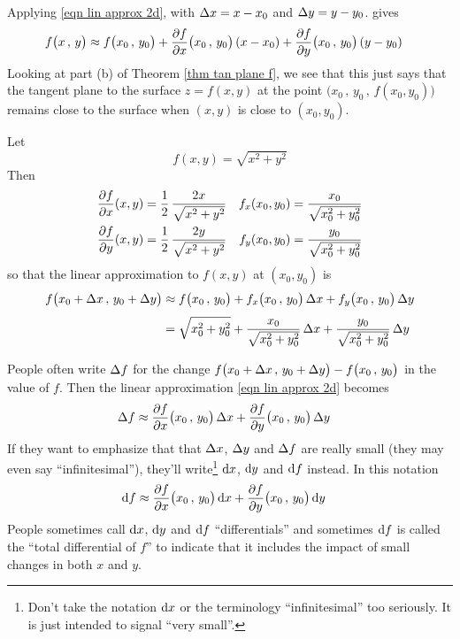 \begin{remark}\label{rmk lin approx tan plane}
Applying \eqref{eqn lin approx 2d}, with $\Delta x=x-x_0$ and $\Delta y = y-y_0$.
gives
\begin{align*}
f\big(x\,,\,y\big)
&\approx f\big(x_0\,,\,y_0\big) 
       + \pdiff{f}{x}\big(x_0\,,\,y_0\big)\,(x-x_0)
       + \pdiff{f}{y}\big(x_0\,,\,y_0\big)\,(y-y_0)
\end{align*}
Looking at part (b) of Theorem \ref{thm tan plane f},
we see that this just says that the tangent plane to the surface 
$z=f(x,y)$ at the point $\big(x_0\,,\,y_0\,,\,f(x_0,y_0)\big)$
remains close to the surface when $(x,y)$ is close to $(x_0,y_0)$.
\end{remark}


\begin{eg}\label{eg approx AA}
Let 
\begin{equation*}
f(x,y) = \sqrt{x^2+y^2}
\end{equation*}
Then
\begin{align*}
\pdiff{f}{x}(x,y)&=\frac{1}{2}\,\frac{2x}{\sqrt{x^2+y^2}} &
    f_x(x_0,y_0)&=\frac{x_0}{\sqrt{x_0^2+y_0^2}} \\
\pdiff{f}{y}(x,y)&=\frac{1}{2}\,\frac{2y}{\sqrt{x^2+y^2}} &
    f_y(x_0,y_0)&=\frac{y_0}{\sqrt{x_0^2+y_0^2}} 
\end{align*}
so that the linear approximation to $f(x,y)$ at $(x_0,y_0)$ is
\begin{align*}
f\big(x_0+\Delta x\,,\,y_0+\Delta y\big)
&\approx f\big(x_0\,,\,y_0\big) 
       + f_x\big(x_0\,,\,y_0\big)\,\Delta x
       + f_y\big(x_0\,,\,y_0\big)\,\Delta y \\[0.05in]
&=\sqrt{x_0^2+y_0^2} 
       + \frac{x_0}{\sqrt{x_0^2+y_0^2}}\,\Delta x
       + \frac{y_0}{\sqrt{x_0^2+y_0^2}}\,\Delta y 
\end{align*}

\end{eg}

\begin{notn}\label{notn approx}
People often write $\Delta f$ for the change 
$f\big(x_0+\Delta x\,,\,y_0+\Delta y\big)
  - f\big(x_0\,,\,y_0\big)$ in the value of $f$. 
Then the linear approximation \eqref{eqn lin approx 2d} becomes
\begin{align*}
\De f
&\approx  \pdiff{f}{x}\big(x_0\,,\,y_0\big)\,\De x
       + \pdiff{f}{y}\big(x_0\,,\,y_0\big)\,\De y
\end{align*}
If they want to emphasize that that $\Delta x$, $\Delta y$ and $\Delta f$
are really small (they may even say ``infinitesimal''), they'll
write\footnote{Don't take the notation $\mathrm{d}x$ or the terminology
``infinitesimal'' too seriously. It is just intended to signal ``very small''.} $\mathrm{d}x$, $\mathrm{d}y$ and $\mathrm{d}f$ instead. In this notation
\begin{align*}
\dee{f}
&\approx  \pdiff{f}{x}\big(x_0\,,\,y_0\big)\,\dee{x}
       + \pdiff{f}{y}\big(x_0\,,\,y_0\big)\,\dee{y}
\end{align*}
People sometimes call $\mathrm{d}x$, $\mathrm{d}y$ and $\mathrm{d}f$ ``differentials'' and
sometimes $\mathrm{d}f$ is called the ``total differential of $f$'' to indicate that
it includes the impact of small changes in both $x$ and $y$.
\end{notn}

